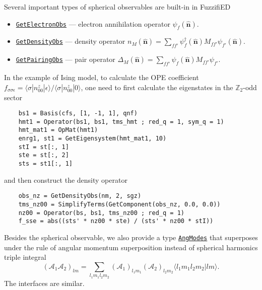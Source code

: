 \documentclass{timesjhep}
\begin{document}
Several important types of spherical observables are built-in in FuzzifiED 
\begin{itemize}
    \item \href{https://docs.fuzzified.world/models/\#FuzzifiED.GetElectronObs-Tuple{Int64,\%20Int64,\%20Int64}}{\lstinline|GetElectronObs|} --- electron annihilation operator $\psi_f(\hat{\mathbf{n}})$.
    \item \href{https://docs.fuzzified.world/models/\#FuzzifiED.GetDensityObs-Tuple{Int64,\%20Int64,\%20Matrix{\%3C:Number}}}{\lstinline|GetDensityObs|} --- density operator $n_M(\hat{\mathbf{n}})=\sum_{ff'}\psi^\dagger_{f}(\hat{\mathbf{n}})M_{ff'}\psi_{f'}(\hat{\mathbf{n}})$.
    \item \href{https://docs.fuzzified.world/models/\#FuzzifiED.GetPairingObs-Tuple{Int64,\%20Int64,\%20Matrix{\%3C:Number}}}{\lstinline|GetPairingObs|} --- pair operator $\Delta_M(\hat{\mathbf{n}})=\sum_{ff'}\psi_{f}(\hat{\mathbf{n}})M_{ff'}\psi_{f'}$. 
\end{itemize} 

In the example of Ising model, to calculate the OPE coefficient $f_{\sigma\sigma\epsilon}=\langle \sigma|n^z_{00}|\epsilon\rangle/\langle \sigma|n^z_{00}|0\rangle$, one need to first calculate the eigenstates in the $\mathbb{Z}_2$-odd sector
\begin{lstlisting}
    bs1 = Basis(cfs, [1, -1, 1], qnf)
    hmt1 = Operator(bs1, bs1, tms_hmt ; red_q = 1, sym_q = 1) 
    hmt_mat1 = OpMat(hmt1)
    enrg1, st1 = GetEigensystem(hmt_mat1, 10)
    stI = st[:, 1] 
    ste = st[:, 2] 
    sts = st1[:, 1]
\end{lstlisting}
and then construct the density operator
\begin{lstlisting}
    obs_nz = GetDensityObs(nm, 2, sgz)
    tms_nz00 = SimplifyTerms(GetComponent(obs_nz, 0.0, 0.0))
    nz00 = Operator(bs, bs1, tms_nz00 ; red_q = 1) 
    f_sse = abs((sts' * nz00 * ste) / (sts' * nz00 * stI))
\end{lstlisting}

Besides the spherical observable, we also provide a type \href{https://docs.fuzzified.world/models/\#FuzzifiED.AngModes}{\lstinline|AngModes|} that superposes under the rule of angular momentum superposition instead of spherical harmonics triple integral
\begin{equation}
    (\mathscr{A}_1\mathscr{A}_2)_{lm}=\sum_{l_1m_1l_2m_2}(\mathcal{A}_1)_{l_1m_1}(\mathcal{A}_2)_{l_2m_2}\langle l_1m_1l_2m_2|lm\rangle.
\end{equation}
The interfaces are similar.
\end{document}
